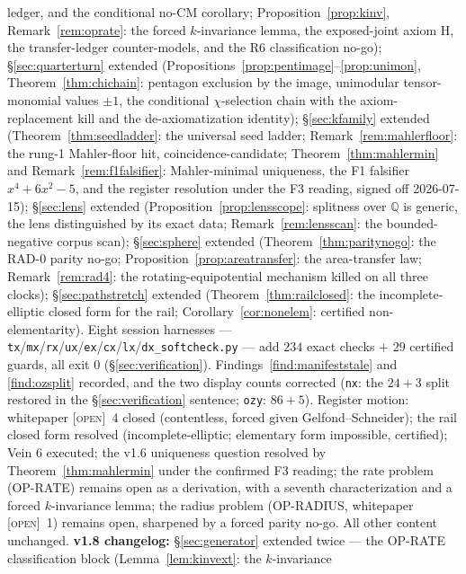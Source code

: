 \documentclass[11pt]{article}
\newcommand{\tagO}{\textcolor{cO}{\textsc{[open]}}}
\newcommand{\Q}{\mathbb{Q}}
\theoremstyle{plain}
\theoremstyle{definition}
\theoremstyle{remark}
\begin{document}
ledger, and the conditional no-CM corollary; Proposition~\ref{prop:kinv},
Remark~\ref{rem:oprate}: the forced $k$-invariance lemma, the exposed-joint
axiom H, the transfer-ledger counter-models, and the R6 classification
no-go); \S\ref{sec:quarterturn} extended
(Propositions~\ref{prop:pentimage}--\ref{prop:unimon},
Theorem~\ref{thm:chichain}: pentagon exclusion by the image, unimodular
tensor-monomial values $\pm1$, the conditional $\chi$-selection chain with
the axiom-replacement kill and the de-axiomatization identity);
\S\ref{sec:kfamily} extended (Theorem~\ref{thm:seedladder}: the universal
seed ladder; Remark~\ref{rem:mahlerfloor}: the rung-1 Mahler-floor hit,
coincidence-candidate; Theorem~\ref{thm:mahlermin} and
Remark~\ref{rem:f1falsifier}: Mahler-minimal uniqueness, the F1 falsifier
$x^4+6x^2-5$, and the register resolution under the F3 reading, signed off
2026-07-15); \S\ref{sec:lens} extended (Proposition~\ref{prop:lensscope}:
splitness over $\Q$ is generic, the lens distinguished by its exact data;
Remark~\ref{rem:lensscan}: the bounded-negative corpus scan);
\S\ref{sec:sphere} extended (Theorem~\ref{thm:paritynogo}: the RAD-0 parity
no-go; Proposition~\ref{prop:areatransfer}: the area-transfer law;
Remark~\ref{rem:rad4}: the rotating-equipotential mechanism killed on all
three clocks); \S\ref{sec:pathstretch} extended
(Theorem~\ref{thm:railclosed}: the incomplete-elliptic closed form for the
rail; Corollary~\ref{cor:nonelem}: certified non-elementarity). Eight session
harnesses ---
\texttt{tx}/\texttt{mx}/\texttt{rx}/\texttt{ux}/\texttt{ex}/\texttt{cx}/\texttt{lx}/\texttt{dx\_softcheck.py}
--- add $234$ exact checks $+$ $29$ certified guards, all exit 0
(\S\ref{sec:verification}). Findings~\ref{find:manifeststale} and
\ref{find:ozsplit} recorded, and the two display counts corrected
(\texttt{nx}: the $24+3$ split restored in the \S\ref{sec:verification}
sentence; \texttt{ozy}: $86+5$). Register motion: whitepaper \tagO{}~4
closed (contentless, forced given Gelfond--Schneider); the rail closed form
resolved (incomplete-elliptic; elementary form impossible, certified); Vein
6 executed; the v1.6 uniqueness question resolved by
Theorem~\ref{thm:mahlermin} under the confirmed F3 reading; the rate problem
(OP-RATE) remains open as a derivation, with a seventh characterization and
a forced $k$-invariance lemma; the radius problem (OP-RADIUS, whitepaper
\tagO{}~1) remains open, sharpened by a forced parity no-go. All other
content unchanged.
\textbf{v1.8 changelog:} \S\ref{sec:generator} extended twice --- the
OP-RATE classification block (Lemma~\ref{lem:kinvext}: the $k$-invariance
\end{document}
